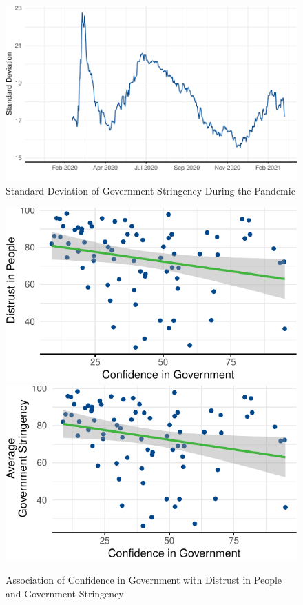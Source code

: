 \documentclass[
  11pt,
]{article}
\begin{document}
\setcounter{table}{0}  \renewcommand{\thetable}{A\arabic{table}} \setcounter{figure}{0} \renewcommand{\thefigure}{A\arabic{figure}}

\begin{figure}
\includegraphics[width=0.8\linewidth]{write_up_test_files/figure-latex/stringency-sd-1} \caption{Standard Deviation of Government Stringency During the Pandemic}\label{fig:stringency-sd}
\end{figure}

\begin{figure}
\includegraphics[width=0.48\linewidth]{write_up_test_files/figure-latex/conf-plots-1} \includegraphics[width=0.48\linewidth]{write_up_test_files/figure-latex/conf-plots-2} \caption{Association of Confidence in Government with Distrust in People and Government Stringency}\label{fig:conf-plots}
\end{figure}
\end{document}
